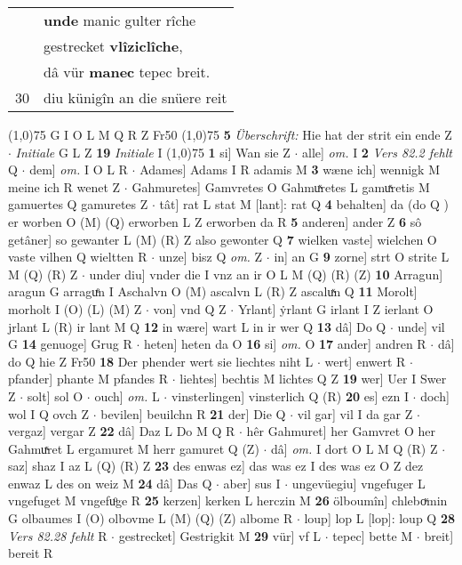 \documentclass[8pt,a4paper,notitlepage]{article}
\begin{document}
\begin{table}[ht]
\begin{minipage}[t]{0.5\linewidth}
\begin{tabular}{rl}
 & \textbf{unde} manic gulter rîche\\ 
 & gestrecket \textbf{vlîziclîche},\\ 
 & dâ vür \textbf{manec} tepec breit.\\ 
30 & diu künigîn an die snüere reit\\ 
\end{tabular}
\scriptsize
\line(1,0){75} \newline
G I O L M Q R Z Fr50 \newline
\line(1,0){75} \newline
\textbf{5} \textit{Überschrift:} Hie hat der strit ein ende Z   $\cdot$ \textit{Initiale} G L Z  \textbf{19} \textit{Initiale} I  \newline
\line(1,0){75} \newline
\textbf{1} si] Wan sie Z  $\cdot$ alle] \textit{om.} I \textbf{2} \textit{Vers 82.2 fehlt} Q   $\cdot$ dem] \textit{om.} I O L R  $\cdot$ Adames] Adams I R adamis M \textbf{3} wæne ich] wennigk M meine ich R wenet Z  $\cdot$ Gahmuretes] Gamvretes O Gahmuͯretes L gamuͯretis M gamuertes Q gamuretes Z  $\cdot$ tât] rat L stat M [lant]: rat Q \textbf{4} behalten] da (do Q ) er worben O (M) (Q) erworben L Z erworben da R \textbf{5} anderen] ander Z \textbf{6} sô getâner] so gewanter L (M) (R) Z also gewonter Q \textbf{7} wielken vaste] wielchen O vaste vilhen Q wieltten R  $\cdot$ unze] bisz Q \textit{om.} Z  $\cdot$ in] an G \textbf{9} zorne] strt O strite L M (Q) (R) Z  $\cdot$ under diu] vnder die I vnz an ir O L M (Q) (R) (Z) \textbf{10} Arragun] aragun G arraguͤn I Aschalvn O (M) ascalvn L (R) Z ascaluͯn Q \textbf{11} Morolt] morholt I (O) (L) (M) Z  $\cdot$ von] vnd Q Z  $\cdot$ Yrlant] ẏrlant G irlant I Z ierlant O jrlant L (R) ir lant M Q \textbf{12} in wære] wart L in ir wer Q \textbf{13} dâ] Do Q  $\cdot$ unde] vil G \textbf{14} genuoge] Grug R  $\cdot$ heten] heten da O \textbf{16} si] \textit{om.} O \textbf{17} ander] andren R  $\cdot$ dâ] do Q hie Z Fr50 \textbf{18} Der phender wert sie liechtes niht L  $\cdot$ wert] enwert R  $\cdot$ pfander] phante M pfandes R  $\cdot$ liehtes] bechtis M lichtes Q Z \textbf{19} wer] Uer I Swer Z  $\cdot$ solt] sol O  $\cdot$ ouch] \textit{om.} L  $\cdot$ vinsterlingen] vinsterlich Q (R) \textbf{20} es] ezn I  $\cdot$ doch] wol I Q ovch Z  $\cdot$ bevilen] beuilchn R \textbf{21} der] Die Q  $\cdot$ vil gar] vil I da gar Z  $\cdot$ vergaz] vergar Z \textbf{22} dâ] Daz L Do M Q R  $\cdot$ hêr Gahmuret] her Gamvret O her Gahmuͯret L ergamuret M herr gamuret Q (Z)  $\cdot$ dâ] \textit{om.} I dort O L M Q (R) Z  $\cdot$ saz] shaz I az L (Q) (R) Z \textbf{23} des enwas ez] das was ez I des was ez O Z dez enwaz L des on weiz M \textbf{24} dâ] Das Q  $\cdot$ aber] sus I  $\cdot$ ungevüegiu] vngefuger L vngefuget M vngefuͦge R \textbf{25} kerzen] kerken L herczin M \textbf{26} ölboumîn] chleboͮmin G olbaumes I (O) olbovme L (M) (Q) (Z) albome R  $\cdot$ loup] lop L [lop]: loup Q \textbf{28} \textit{Vers 82.28 fehlt} R   $\cdot$ gestrecket] Gestrigkit M \textbf{29} vür] vf L  $\cdot$ tepec] bette M  $\cdot$ breit] bereit R \newline

\end{minipage}
\end{table}
\end{document}
